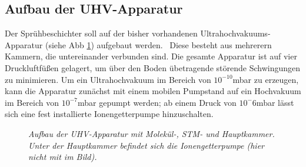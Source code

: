 \subsection{Aufbau der UHV-Apparatur}

Der Sprühbeschichter soll auf der bisher vorhandenen Ultrahochvakuums-Apparatur (siehe Abb
\ref{uhvaufbau}) aufgebaut werden.~%
 Diese besteht aus mehrerern Kammern, die untereinander verbunden sind. Die gesamte Apparatur ist
auf vier Druckluftfüßen gelagert, um über den Boden übetragende störende Schwingungen zu minimieren. Um ein
Ultrahochvakuum im Bereich von $10^{-10}$mbar zu erzeugen, kann die Apparatur zunächst mit einem
mobilen Pumpstand %
auf ein Hochvakuum im Bereich von
$10^{-7}$mbar gepumpt werden; ab einem Druck von $10^-6$mbar lässt sich eine fest installierte
Ionengetterpumpe hinzuschalten.

\begin{figure}[H]
\centering
\sffamily

\caption{\textit{Aufbau der UHV-Apparatur mit Molekül-, STM- und Hauptkammer. Unter der
Hauptkammer befindet sich die Ionengetterpumpe (hier nicht mit im Bild).}}
\label{uhvaufbau}
\end{figure}

